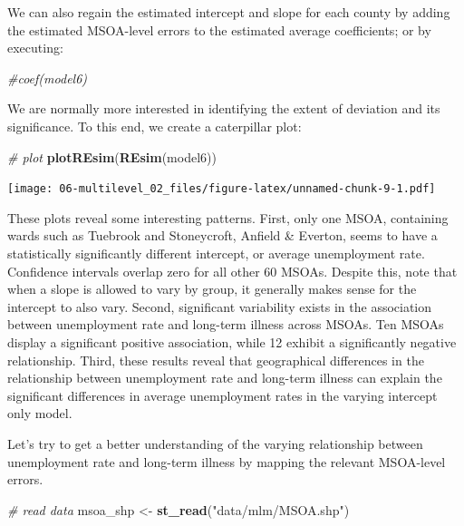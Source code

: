 \documentclass[]{book}
\newenvironment{Shaded}{\begin{snugshade}}{\end{snugshade}}
\newcommand{\KeywordTok}[1]{\textcolor[rgb]{0.13,0.29,0.53}{\textbf{#1}}}
\newcommand{\StringTok}[1]{\textcolor[rgb]{0.31,0.60,0.02}{#1}}
\newcommand{\CommentTok}[1]{\textcolor[rgb]{0.56,0.35,0.01}{\textit{#1}}}
\newcommand{\NormalTok}[1]{#1}
\begin{document}
We can also regain the estimated intercept and slope for each county by
adding the estimated MSOA-level errors to the estimated average
coefficients; or by executing:

\begin{Shaded}
\begin{Highlighting}[]
\CommentTok{#coef(model6)}
\end{Highlighting}
\end{Shaded}

We are normally more interested in identifying the extent of deviation
and its significance. To this end, we create a caterpillar plot:

\begin{Shaded}
\begin{Highlighting}[]
\CommentTok{# plot}
\KeywordTok{plotREsim}\NormalTok{(}\KeywordTok{REsim}\NormalTok{(model6))}
\end{Highlighting}
\end{Shaded}

\texttt{[image: 06-multilevel\_02\_files/figure-latex/unnamed-chunk-9-1.pdf]}

These plots reveal some interesting patterns. First, only one MSOA,
containing wards such as Tuebrook and Stoneycroft, Anfield \& Everton,
seems to have a statistically significantly different intercept, or
average unemployment rate. Confidence intervals overlap zero for all
other 60 MSOAs. Despite this, note that when a slope is allowed to vary
by group, it generally makes sense for the intercept to also vary.
Second, significant variability exists in the association between
unemployment rate and long-term illness across MSOAs. Ten MSOAs display
a significant positive association, while 12 exhibit a significantly
negative relationship. Third, these results reveal that geographical
differences in the relationship between unemployment rate and long-term
illness can explain the significant differences in average unemployment
rates in the varying intercept only model.

Let's try to get a better understanding of the varying relationship
between unemployment rate and long-term illness by mapping the relevant
MSOA-level errors.

\begin{Shaded}
\begin{Highlighting}[]
\CommentTok{# read data}
\NormalTok{msoa_shp <-}\StringTok{ }\KeywordTok{st_read}\NormalTok{(}\StringTok{"data/mlm/MSOA.shp"}\NormalTok{)}
\end{Highlighting}
\end{Shaded}
\end{document}
